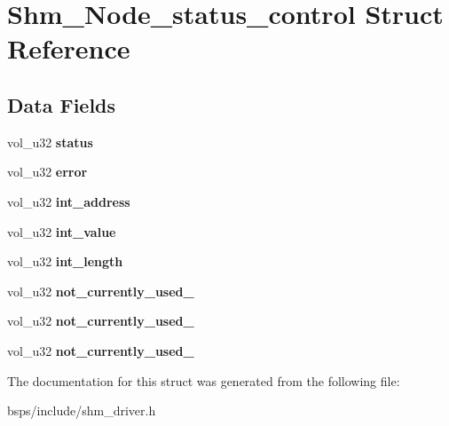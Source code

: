 \hypertarget{structShm__Node__status__control}{}\section{Shm\+\_\+\+Node\+\_\+status\+\_\+control Struct Reference}
\label{structShm__Node__status__control}
\subsection*{Data Fields}
\begin{DoxyCompactItemize}
\item 
\mbox{\label{structShm__Node__status__control_a1b08d4e6308f50d996c9f311fe5f16f0}} 
vol\+\_\+u32 {\bfseries status}
\item 
\mbox{\label{structShm__Node__status__control_afdf14e716fb2a0e5ebd7482efa150609}} 
vol\+\_\+u32 {\bfseries error}
\item 
\mbox{\label{structShm__Node__status__control_a200e8c5b28ed31db94deca97eb4beee4}} 
vol\+\_\+u32 {\bfseries int\+\_\+address}
\item 
\mbox{\label{structShm__Node__status__control_ab058c0740d7a2fe157dea399c4524f3f}} 
vol\+\_\+u32 {\bfseries int\+\_\+value}
\item 
\mbox{\label{structShm__Node__status__control_af0af30ec6b43916b7f6daf3357a0c056}} 
vol\+\_\+u32 {\bfseries int\+\_\+length}
\item 
\mbox{\label{structShm__Node__status__control_a5c53c11affbdd29badce44d7d7146559}} 
vol\+\_\+u32 {\bfseries not\+\_\+currently\+\_\+used\+\_}
\item 
\mbox{\label{structShm__Node__status__control_ae610683ee4b39a25a9e860fc73102b48}} 
vol\+\_\+u32 {\bfseries not\+\_\+currently\+\_\+used\+\_}
\item 
\mbox{\label{structShm__Node__status__control_ae74a0f551da724335b5b3ef638a42cbe}} 
vol\+\_\+u32 {\bfseries not\+\_\+currently\+\_\+used\+\_}
\end{DoxyCompactItemize}


The documentation for this struct was generated from the following file\+:\begin{DoxyCompactItemize}
\item 
bsps/include/shm\+\_\+driver.\+h\end{DoxyCompactItemize}
